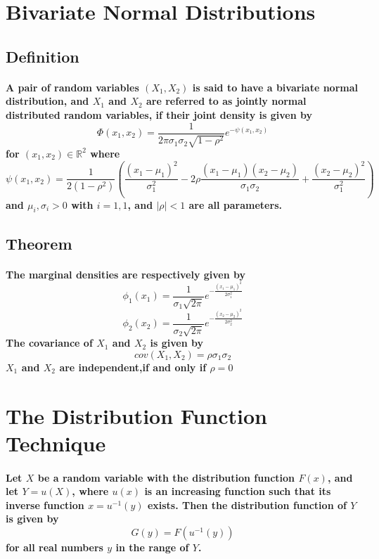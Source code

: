 \documentclass[titlepage]{article}
\begin{document}
    \section{Bivariate Normal Distributions}
        \subsection*{Definition}
            \paragraph{
                A pair of random variables $(X_1,X_2)$ is said to have a bivariate normal distribution, and $X_1$ and $X_2$ are referred to as jointly normal distributed random variables, if their joint density is given by 
                $$\Phi(x_1,x_2)=\frac{1}{2\pi\sigma_1\sigma_2\sqrt{1-\rho^2}}e^{-\psi(x_1,x_2)}$$
                for $(x_1,x_2)\in \mathbb{R}^2$
                where
                $$\psi(x_1,x_2)=\frac{1}{2(1-\rho^2)}(\frac{(x_1-\mu_1)^2}{\sigma_1^2}-2\rho\frac{(x_1-\mu_1)(x_2-\mu_2)}{\sigma_1\sigma_2}+\frac{(x_2-\mu_2)^2}{\sigma_1^2})$$and $\mu_i,\sigma_i>0$ with $i=1,1$, and $|\rho|<1$ are all parameters.
            }
        \subsection*{Theorem}
            \paragraph{
                The marginal densities are respectively given by 
                $$\phi_1(x_1)=\frac{1}{\sigma_1\sqrt{2\pi}}e^{-\frac{(x_1-\mu_1)^2}{2\sigma_1^2}}$$
                $$\phi_2(x_2)=\frac{1}{\sigma_2\sqrt{2\pi}}e^{-\frac{(x_2-\mu_2)^2}{2\sigma_2^2}}$$
                The covariance of $X_1$ and $X_2$ is given by 
                $$cov(X_1,X_2)=\rho\sigma_1\sigma_2$$    
                $X_1$ and $X_2$ are independent,if and only if $\rho=0$
            }
    \section{The Distribution Function Technique}
            \paragraph{
                Let $X$ be a random variable with the distribution function $F(x)$, and let $Y=u(X)$, where $u(x)$ is an increasing function such that its inverse function $x=u^{-1}(y)$ exists. Then the distribution function of $Y$ is given by 
                $$G(y)=F(u^{-1}(y))$$
                for all real numbers $y$ in the range of $Y$.
            }
\end{document}
